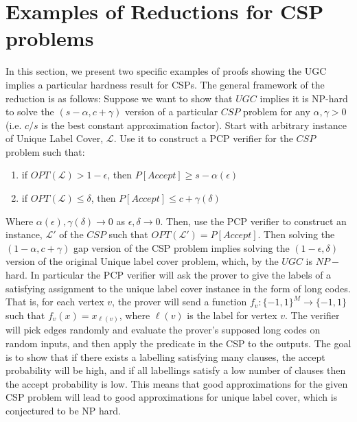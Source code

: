 \documentclass{article}
\newcommand{\1}{\mathbbm{1}}
\begin{document}
\section*{Examples of Reductions for CSP problems}
In this section, we present two specific examples of proofs showing the UGC implies a particular hardness result for CSPs. The general framework of the reduction is as follows: Suppose we want to show that $UGC$ implies it is NP-hard to solve the $(s-\alpha, c+\gamma)$ version of a particular $CSP$ problem for any $\alpha, \gamma > 0$ (i.e. $c/s$ is the best constant approximation factor). Start with arbitrary instance of Unique Label Cover, $\mathcal{L}$. Use it to construct a PCP verifier for the $CSP$ problem such that:
\begin{enumerate}[1)]
            \item if $OPT(\mathcal{L}) > 1-\epsilon$, then $P[Accept] \geq s-\alpha(\epsilon)$
            \item if $OPT(\mathcal{L}) \leq \delta$, then $P[Accept] \leq c+\gamma(\delta)$
\end{enumerate}
Where $\alpha(\epsilon), \gamma(\delta)\rightarrow 0$ as $\epsilon,\delta\rightarrow 0$. Then, use the PCP verifier to construct an instance, $\mathcal{L}'$ of the $CSP$ such that $OPT(\mathcal{L}') = P[Accept]$. Then solving the $(1-\alpha, c+\gamma)$ gap version of the CSP problem implies solving the $(1-\epsilon, \delta)$ version of the original Unique label cover problem, which, by the $UGC$ is $NP-$hard. In particular the PCP verifier will ask the prover to give the labels of a satisfying assignment to the unique label cover instance in the form of long codes. That is, for each vertex $v$, the prover will send a function $f_v:\{-1,1\}^M\rightarrow \{-1,1\}$ such that $f_v(x) = x_{\ell(v)}$, where $\ell(v)$ is the label for vertex $v$. The verifier will pick edges randomly and evaluate the prover's supposed long codes on random inputs, and then apply the predicate in the CSP to the outputs. The goal is to show that if there exists a labelling satisfying many clauses, the accept probability will be high, and if all labellings satisfy a low number of clauses then the accept probability is low. This means that good approximations for the given CSP problem will lead to good approximations for unique label cover, which is conjectured to be NP hard.
\end{document}
